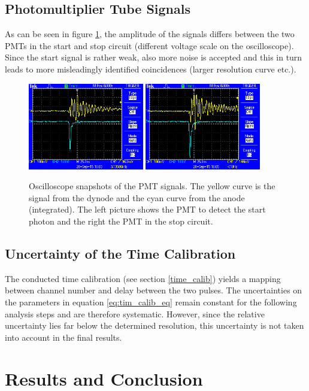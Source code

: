 \documentclass[
	paper=A4,
	parskip=full,
	chapterprefix=true,
	11pt,
	headings=normal,
	bibliography=totoc,
	listof=totoc,
	titlepage=on,
]{scrreprt}
\begin{document}
\section{Photomultiplier Tube Signals}
As can be seen in figure \ref{fig:pmt_signals}, the amplitude of the signals differs between the two PMTs in the start and stop circuit (different voltage scale on the oscilloscope). Since the start signal is rather weak, also more noise is accepted and this in turn leads to more misleadingly identified coincidences (larger resolution curve etc.).

\begin{figure}
	\centering
	\includegraphics[width=0.45\textwidth]{../images/gate_vs_dynode/F0003TEK.png}
	\includegraphics[width=0.45\textwidth]{../images/gate_vs_dynode/F0004TEK.png}
	\caption{Oscilloscope snapshots of the PMT signals. The yellow curve is the signal from the dynode and the cyan curve from the anode (integrated). The left picture shows the PMT to detect the start photon and the right the PMT in the stop circuit.}
	\label{fig:pmt_signals}
\end{figure}

\section{Uncertainty of the Time Calibration}
The conducted time calibration (see section \ref{time_calib}) yields a mapping between channel number and delay between the two pulses. The uncertainties on the parameters in equation \ref{eq:tim_calib_eq} remain constant for the following analysis steps and are therefore systematic. However, since the relative uncertainty lies far below the determined resolution, this uncertainty is not taken into account in the final results. 

\chapter{Results and Conclusion}


\cleardoublepage


{}
\end{document}
